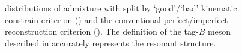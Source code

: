 \begin{figure}[htbp!]
    \centering
    \caption{\label{fig:good_tag_definitions} \Mbc distributions of \BtoXsgamma admixture with split by `good'/`bad' kinematic constrain criterion ()
    and the conventional perfect/imperfect reconstruction criterion ().
    The definition of the tag-$B$ meson described in 
    accurately represents the resonant \Mbc structure.
    }
\end{figure}